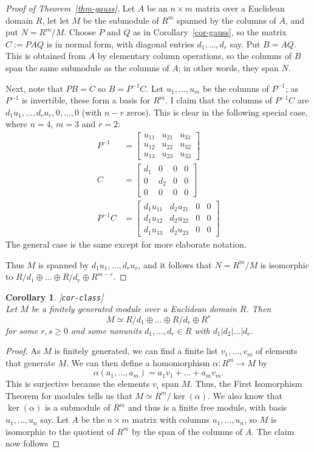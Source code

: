 \documentclass{amsart}
\newcommand{\lbl}[1]{\label{#1}\textup{[\texttt{#1}]}\ \\}
\newcommand{\lbl}{\label}
\newcommand{\bbm}       {\left[\begin{matrix}}
\newcommand{\ebm}       {\end{matrix}\right]}
\newcommand{\al}        {\alpha}
\newcommand{\tm}        {\times}
\newcommand{\xra}       {\xrightarrow}
\newcommand{\op}        {\oplus}
\renewcommand{\:}{\colon}
\newtheorem{corollary}[theorem]{Corollary}
\theoremstyle{definition}
\begin{document}
\begin{proof}[Proof of Theorem~\ref{thm-gauss}]
 Let $A$ be an $n\tm m$ matrix over a Euclidean domain $R$, let let
 $M$ be the submodule of $R^m$ spanned by the columns of $A$, and put
 $N=R^m/M$.  Choose $P$ and $Q$ as in Corollary~\ref{cor-gauss}, so
 the matrix $C:=PAQ$ is in normal form, with diagonal entries
 $d_1,\ldots,d_r$ say.  Put $B=AQ$.  This is obtained from $A$ by
 elementary column operations, so the columns of $B$ span the same
 submodule as the columns of $A$; in other words, they span $N$.

 Next, note that $PB=C$ so $B=P^{-1}C$.  Let $u_1,\ldots,u_m$ be the
 columns of $P^{-1}$; as $P^{-1}$ is invertible, these form a basis
 for $R^m$.  I claim that the columns of $P^{-1}C$ are
 $d_1u_1,\ldots,d_ru_r,0,\ldots,0$ (with $n-r$ zeros).  This is clear
 in the following special case, where $n=4$, $m=3$ and $r=2$:
 \begin{align*}
  P^{-1}  &= \bbm u_{11} & u_{21} & u_{31} \\
                  u_{12} & u_{22} & u_{32} \\
                  u_{13} & u_{23} & u_{33} \ebm \\
  C       &= \bbm d_1 & 0 & 0 & 0 \\
                  0 & d_2 & 0 & 0 \\
                  0 & 0 & 0 & 0 \ebm \\
  P^{-1}C &= \bbm d_1 u_{11} & d_2 u_{21} & 0 & 0 \\
                  d_1 u_{12} & d_2 u_{22} & 0 & 0 \\
                  d_1 u_{13} & d_2 u_{23} & 0 & 0 \ebm
 \end{align*}
 The general case is the same except for more elaborate notation.

 Thus $M$ is spanned by $d_1u_1,\ldots,d_ru_r$, and it follows that 
 $N=R^m/M$ is isomorphic to $R/d_1\op\ldots\op R/d_r\op R^{m-r}$.
\end{proof}

\begin{corollary}\lbl{cor-class}
 Let $M$ be a finitely generated module over a Euclidean domain $R$.
 Then
 \[ M\simeq R/d_1\op\ldots\op R/d_r \op R^s \]
 for some $r,s\geq 0$ and some nonunits $d_1,\ldots,d_r\in R$ with
 $d_1|d_2|\ldots|d_r$. 
\end{corollary}
\begin{proof}
 As $M$ is finitely generated, we can find a finite list
 $v_1,\ldots,v_m$ of elements that generate $M$.  We can then define a
 homomorphism $\al\:R^m\xra{}M$ by
 \[ \al(a_1,\ldots,a_m)=a_1v_1+\ldots+a_mv_m. \]
 This is surjective because the elements $v_i$ span $M$.  Thus, the
 First Isomorphism Theorem for modules tells us that
 $M\simeq R^m/\ker(\al)$.  We also know that $\ker(\al)$ is a
 submodule of $R^m$ and thus is a finite free module, with basis
 $u_1,\ldots,u_n$ say.  Let $A$ be the $n\tm m$ matrix with columns
 $u_1,\ldots,u_n$, so $M$ is isomorphic to the quotient of $R^m$ by
 the span of the columns of $A$.  The claim now follows 
\end{proof}
\end{document}
